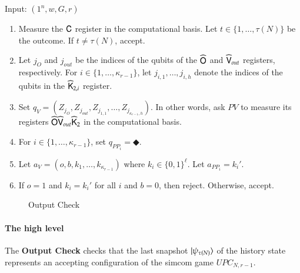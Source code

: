 \vspace{10pt}
\begin{center}
\begin{mdframed}
    Input: $(1^n,w,G,r)$
    \begin{enumerate}
		\item Measure the ${\mathsf{C}}$ register in the computational basis. Let $t \in \{1,\ldots,\tau(N)\}$ be the outcome. If $t \neq \tau(N)$, accept.
		
		\item Let $j_O$ and $j_{out}$ be the indices of the qubits of the $\widehat{{\mathsf{O}}}$ and $\widehat{{\mathsf{V}}}_{out}$ registers, respectively. For $i \in \{1,\ldots,\kappa_{r-1}\}$, let $j_{i,1},\ldots,j_{i,h}$ denote the indices of the qubits in the $\widehat{{\mathsf{K}}}_{2,i}$ register. 
		\item Set $q_V = (Z_{j_O},Z_{j_{out}},Z_{j_{1,1}},\ldots,Z_{j_{\kappa_{r-1},h}})$. In other words, ask $PV$ to measure its registers $\widehat{{\mathsf{O}}} \widehat{{\mathsf{V}}}_{out} \widehat{{\mathsf{K}}}_2$ in the computational basis. 
		\item For $i \in \{1,\ldots,\kappa_{r-1}\}$, set $q_{PP_i} = \Diamondblack$. 
		\item Let $a_V = (o,b,k_1,\ldots,k_{\kappa_{r-1}})$ where $k_i \in \{0,1\}^{\ell}$. Let $a_{PP_i} = k_i'$. 
		\item If $o = 1$ and $k_i = k_i'$ for all $i$ and $b = 0$, then reject. Otherwise, accept.
	\end{enumerate}    
\end{mdframed}
\end{center}
\begin{figure}[H]
\caption{Output Check}
\label{fig:output_check}
\end{figure}


\paragraph{The high level} The \textbf{Output Check} checks that the last snapshot $|\psi_{\tau(N)}\rangle$ of the history state represents an accepting configuration of the simcom game $UPC_{N,r-1}$. 


